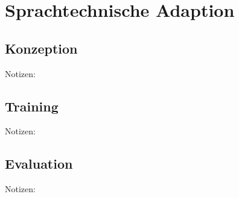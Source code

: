 \chapter{Sprachtechnische Adaption}
\thispagestyle{fancy}
\label{chap:Sprachtechnische Adaption}


\section{Konzeption}
Notizen:


\section{Training}
Notizen:


\section{Evaluation}
Notizen:
